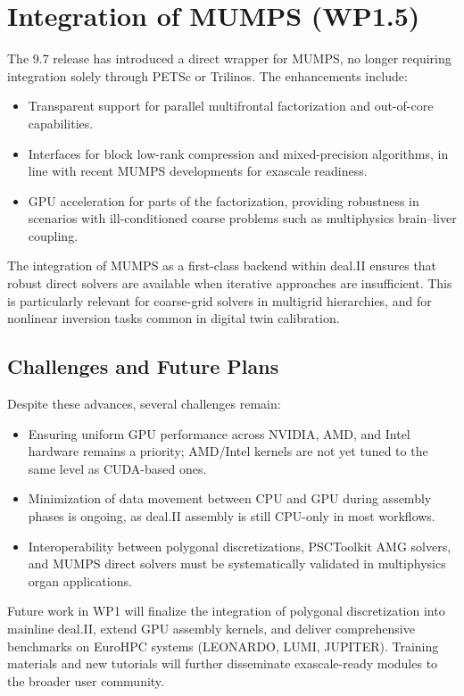 \documentclass[a4paper,12pt]{article}
\begin{document}
\section{Integration of MUMPS (WP1.5)}
\label{sec:section3}

The 9.7 release has introduced a direct wrapper for MUMPS, no longer requiring
integration solely through PETSc or Trilinos. The enhancements include:

\begin{itemize}
  \item Transparent support for parallel multifrontal factorization and
        out-of-core capabilities.
  \item Interfaces for block low-rank compression and mixed-precision
        algorithms, in line with recent MUMPS developments for exascale
        readiness.
  \item GPU acceleration for parts of the factorization, providing robustness in
        scenarios with ill-conditioned coarse problems such as multiphysics
        brain–liver coupling.
\end{itemize}

The integration of MUMPS as a first-class backend within deal.II ensures that
robust direct solvers are available when iterative approaches are insufficient.
This is particularly relevant for coarse-grid solvers in multigrid hierarchies,
and for nonlinear inversion tasks common in digital twin calibration.

\subsection{Challenges and Future Plans}

Despite these advances, several challenges remain:

\begin{itemize}
  \item Ensuring uniform GPU performance across NVIDIA, AMD, and Intel hardware
        remains a priority; AMD/Intel kernels are not yet tuned to the same
        level as CUDA-based ones.
  \item Minimization of data movement between CPU and GPU during assembly phases
        is ongoing, as deal.II assembly is still CPU-only in most workflows.
  \item Interoperability between polygonal discretizations, PSCToolkit AMG
        solvers, and MUMPS direct solvers must be systematically validated in
        multiphysics organ applications.
\end{itemize}

Future work in WP1 will finalize the integration of polygonal discretization
into mainline deal.II, extend GPU assembly kernels, and deliver comprehensive
benchmarks on EuroHPC systems (LEONARDO, LUMI, JUPITER). Training materials and
new tutorials will further disseminate exascale-ready modules to the broader
user community.

\label{MyLastPage}
\end{document}
